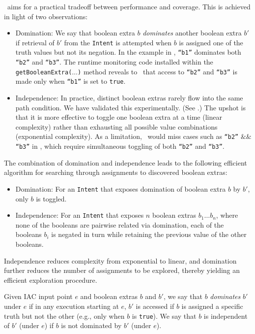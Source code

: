 \Tool\ aims for a practical tradeoff between performance and coverage. This is achieved in light of two observations:
\begin{itemize}
	\item Domination: We say that boolean extra $b$ \emph{dominates} another boolean extra $b'$ if retrieval of $b'$ from the {\tt Intent} is attempted when $b$ is assigned one of the truth values but not its negation. In the example in , {\tt ``b1''} dominates both {\tt ``b2''} and {\tt ``b3''}. The runtime monitoring code installed within the {\tt getBooleanExtra($\ldots$)} method reveals to \Tool\ that access to {\tt ``b2''} and {\tt ``b3''} is made only when {\tt ``b1''} is set to {\tt true}.
	\item Independence: In practice, distinct boolean extras rarely flow into the same path condition. We have validated this experimentally. (See .) The upshot is that it is more effective to toggle one boolean extra at a time (linear complexity) rather than exhausting all possible value combinations (exponential complexity). As a limitation, \Tool\ would miss cases such as {\tt ``b2''} $\&\&$ {\tt ``b3''} in , which require simultaneous toggling of both {\tt ``b2''} and {\tt ``b3''}.
\end{itemize}

The combination of domination and independence leads to the following efficient algorithm for searching through assignments to discovered boolean extras: 
\begin{itemize}
	\item Domination: For an {\tt Intent} that exposes domination of boolean extra $b$ by  $b'$, only $b$ is toggled.
	\item Independence: For an {\tt Intent} that exposes $n$ boolean extras $b_1 \ldots b_n$, where none of the booleans are pairwise related via domination, each of the booleans $b_i$ is negated in turn while retaining the previous value of the other booleans.
\end{itemize}
Independence reduces complexity from exponential to linear, and domination further reduces the number of assignments to be explored, thereby yielding an efficient exploration procedure.

\begin{definition} Given IAC input point $e$ and boolean extras $b$ and $b'$, we say that $b$ \emph{dominates} $b'$ under $e$ if in any execution starting at $e$, $b'$ is accessed if $b$ is assigned a specific truth but not the other (e.g., only when $b$ is {\tt true}). We say that $b$ is independent of $b'$ (under $e$) if $b$ is not dominated by $b'$ (under $e$).
\end{definition}

